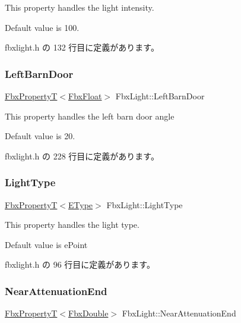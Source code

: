 This property handles the light intensity.

Default value is 100. 

 fbxlight.\+h の 132 行目に定義があります。

\mbox{\label{class_fbx_light_afcf3b7db2cad32e11bb6fa016a402bc7}} 
\subsubsection{\texorpdfstring{Left\+Barn\+Door}{LeftBarnDoor}}
{\footnotesize\ttfamily \hyperlink{class_fbx_property_t}{Fbx\+PropertyT}$<$\hyperlink{fbxtypes_8h_aef968e37f2ddc4188de464d8578c1d5c}{Fbx\+Float}$>$ Fbx\+Light\+::\+Left\+Barn\+Door}

This property handles the left barn door angle

Default value is 20. 

 fbxlight.\+h の 228 行目に定義があります。

\mbox{\label{class_fbx_light_a2ce6e644dd2f9d7140c192d27d70ff93}} 
\subsubsection{\texorpdfstring{Light\+Type}{LightType}}
{\footnotesize\ttfamily \hyperlink{class_fbx_property_t}{Fbx\+PropertyT}$<$\hyperlink{class_fbx_light_ace4ba495501bddf1341600bea7ed8daf}{E\+Type}$>$ Fbx\+Light\+::\+Light\+Type}

This property handles the light type.

Default value is e\+Point 

 fbxlight.\+h の 96 行目に定義があります。

\mbox{\label{class_fbx_light_adb8b8187ea6c10eca1c82d1a2b769d53}} 
\subsubsection{\texorpdfstring{Near\+Attenuation\+End}{NearAttenuationEnd}}
{\footnotesize\ttfamily \hyperlink{class_fbx_property_t}{Fbx\+PropertyT}$<$\hyperlink{fbxtypes_8h_a171e72a1c46fc15c1a6c9c31948c1c5b}{Fbx\+Double}$>$ Fbx\+Light\+::\+Near\+Attenuation\+End}

